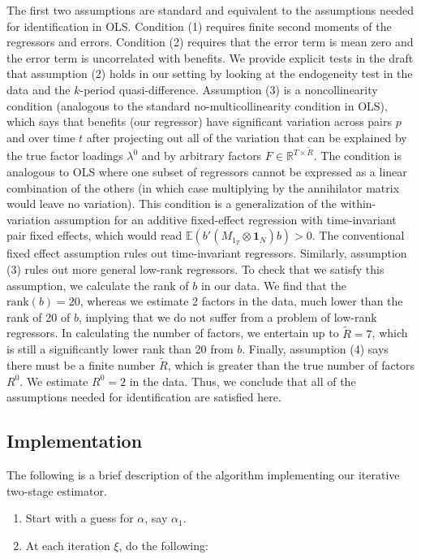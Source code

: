 \documentclass[12pt]{article}
\newcommand{\1}{\mathbf{1}}
\begin{document}
\begin{appendix}
The first two assumptions are standard and equivalent to the assumptions needed for identification in OLS. Condition (1) requires finite second moments of the regressors and errors. Condition (2) requires that the error term is mean zero and the error term is uncorrelated with benefits. We provide explicit tests in the draft that assumption (2) holds in our setting by looking at the endogeneity test in the data and the $k$-period quasi-difference. Assumption (3) is a noncollinearity condition (analogous to the standard no-multicollinearity condition in OLS), which says that benefits (our regressor) have significant variation across pairs $p$ and over time $t$ after projecting out all of the variation that can be explained by the true factor loadings $\lambda^0$ and by arbitrary factors $F\in\mathbb{R}^{T\times \tilde{R}}$. The condition is analogous to OLS where one subset of regressors cannot be expressed as a linear combination of the others (in which case multiplying by the annihilator matrix would leave no variation). This condition is a generalization of the within-variation assumption for an additive fixed-effect regression with time-invariant pair fixed effects, which would read $\mathbb{E}\left(b'\left(M_{1_T}\otimes \mathbf{1}_N \right)b\right)>0.$ The conventional fixed effect assumption rules out time-invariant regressors. Similarly, assumption (3) rules out more general low-rank regressors. To check that we satisfy this assumption, we calculate the rank of $b$ in our data. We find that the $\textrm{rank}(b)=20$, whereas we estimate 2 factors in the data, much lower than the rank of 20 of $b$, implying that we do not suffer from a problem of low-rank regressors. In calculating the number of factors, we entertain up to $\tilde{R}=7$, which is still a significantly lower rank than 20 from $b$. Finally, assumption (4) says there must be a finite number $\tilde{R}$, which is greater than the true number of factors $R^0$. We estimate $R^0=2$ in the data. Thus, we conclude that all of the assumptions needed for identification are satisfied here.

\subsection{Implementation}
The following is a brief description of the algorithm implementing our iterative two-stage estimator.
\begin{enumerate}
\item Start with a guess for $\alpha$, say $\alpha_{1}$.
\item At each iteration $\xi$, do the following:


\end{enumerate}
\end{appendix}
\end{document}
